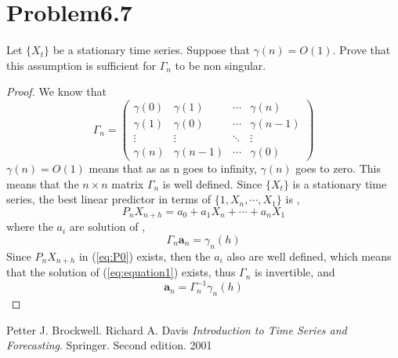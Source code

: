 \documentclass[11pt, oneside]{article}   	%
\begin{document}

\section{Problem6.7}
Let $\{X_{t}\}$ be a stationary time series. Suppose that $\gamma(n) =O(1)$. Prove that this assumption is sufficient for $\Gamma_{n}$ to be non singular.

\begin{proof}
We know that 
\begin{equation}
\Gamma_{n} = 
\begin{pmatrix}
  \gamma(0) & \gamma(1) & \cdots & \gamma(n) \\
  \gamma(1) & \gamma(0) & \cdots & \gamma(n-1) \\
  \vdots  & \vdots  & \ddots & \vdots  \\
  \gamma(n) & \gamma(n-1) & \cdots & \gamma(0) 
 \end{pmatrix}
\end{equation}
$\gamma(n) = O(1)$ means that as as n goes to infinity, $\gamma(n)$ goes to zero. This means that the $n\times n$ matrix $\Gamma_{n}$ is well defined. 
Since $\{X_{t}\}$ is a stationary time series, the best linear predictor in terms of $\{1, X_{n}, \cdots, X_{1}\}$ is \cite{petter},
\begin{equation}\label{eq:P0}
P_{n}X_{n+h} = a_{0} + a_{1}X_{n}+\cdots+a_{n}X_{1}
\end{equation}
where the $a_{i}$ are solution of \cite{petter},
\begin{equation}\label{eq:equation1}
\Gamma_{n}\textbf{a}_{n} = \gamma_{n}(h)
\end{equation}
Since $P_{n}X_{n+h}$ in (\ref{eq:P0}) exists, then the $a_{i}$ also are well defined, which means that the solution of (\ref{eq:equation1}) exists, thus $\Gamma_{n}$ is invertible, and
\begin{equation}\label{eq:equation2}
\textbf{a}_{n} = \Gamma_{n}^{-1}\gamma_{n}(h)
\end{equation}

\end{proof}
\begin{thebibliography}{9}
Petter J. Brockwell. Richard A. Davis
\textit{Introduction to Time Series and Forecasting}. 
Springer. Second edition. 2001
 
\end{thebibliography}
\end{document}
